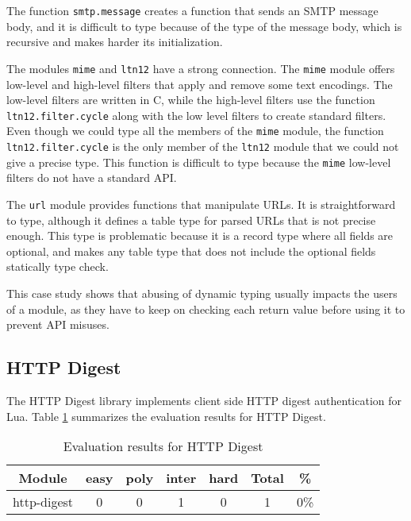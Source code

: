 The function \texttt{smtp.message} creates a function that sends
an SMTP message body, and it is difficult to type because of the
type of the message body, which is recursive and makes harder
its initialization.

The modules \texttt{mime} and \texttt{ltn12} have a strong connection.
The \texttt{mime} module offers low-level and high-level filters
that apply and remove some text encodings.
The low-level filters are written in C, while the high-level filters
use the function \texttt{ltn12.filter.cycle} along with the low level
filters to create standard filters.
Even though we could type all the members of the \texttt{mime} module,
the function \texttt{ltn12.filter.cycle} is the only member of the
\texttt{ltn12} module that we could not give a precise type.
This function is difficult to type because the \texttt{mime} low-level
filters do not have a standard API.

The \texttt{url} module provides functions that manipulate URLs.
It is straightforward to type, although it defines a table type for
parsed URLs that is not precise enough.
This type is problematic because it is a record type where all
fields are optional, and makes any table type that does not include
the optional fields statically type check.

This case study shows that abusing of dynamic typing usually impacts
the users of a module, as they have to keep on checking each return
value before using it to prevent API misuses.

\subsection{HTTP Digest}

The HTTP Digest library implements client side HTTP digest authentication for Lua.
Table \ref{tab:evalhttpdigest} summarizes the evaluation results for HTTP Digest.

\begin{table}[!ht]
\begin{center}
\begin{tabular}{|c|c|c|c|c|c|c|}
\hline
\textbf{Module} & \textbf{easy} & \textbf{poly} & \textbf{inter} & \textbf{hard} & \textbf{Total} & \textbf{\%} \\
\hline
http-digest & 0 & 0 & 1 & 0 & 1 & 0\% \\
\hline
\end{tabular}
\end{center}
\caption{Evaluation results for HTTP Digest}
\label{tab:evalhttpdigest}
\end{table}

